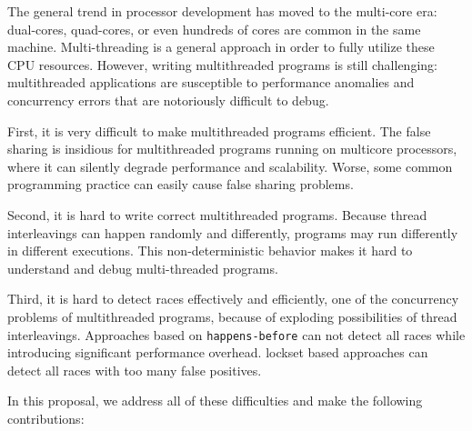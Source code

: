 The general trend in processor development has moved to the multi-core era: 
dual-cores, quad-cores, or even hundreds of cores are common in the same machine. 
Multi-threading is a general approach in order to fully utilize these CPU resources.
However, writing multithreaded programs is still challenging: multithreaded 
applications are susceptible to performance anomalies and concurrency errors 
that are notoriously difficult to debug.

First, it is very difficult to make multithreaded programs efficient.
The false sharing is insidious for multithreaded programs
running on multicore processors, where it can silently degrade
performance and scalability. Worse, some common programming practice
can easily cause false sharing problems.

Second, it is hard to write correct multithreaded programs.  
Because thread interleavings can happen randomly and differently,  
programs may run differently in different executions. 
This non-deterministic behavior makes it hard to understand and debug multi-threaded programs.

Third, it is hard to detect races effectively and efficiently, 
one of the concurrency problems of multithreaded 
programs, because of exploding possibilities of thread interleavings\cite{interleavingcoverage}. 
Approaches based on \texttt{happens-before} can not detect all races while introducing
significant performance overhead. lockset based approaches can detect all races with 
too many false positives.   

In this proposal, we address all of these difficulties and make the following contributions:

